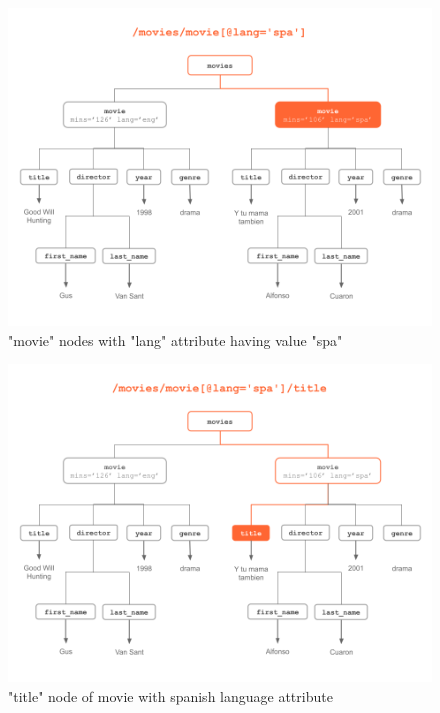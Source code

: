 \documentclass[
]{book}
\begin{document}
\begin{figure}

{\centering \includegraphics[width=0.85\linewidth]{images/xpath/xpath-example9} 

}

\caption{"movie" nodes with "lang" attribute having value "spa"}\label{fig:unnamed-chunk-59}
\end{figure}

\begin{figure}

{\centering \includegraphics[width=0.85\linewidth]{images/xpath/xpath-example10} 

}

\caption{"title" node of movie with spanish language attribute}\label{fig:unnamed-chunk-60}
\end{figure}
\end{document}

